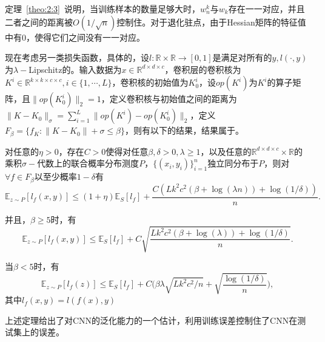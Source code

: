 \par
定理~\ref{theo:2:3}~说明，当训练样本的数量足够大时，$w_n^k$与$w_k$存在一一对应，并且二者之间的距离被$O(1/\sqrt{n})$控制住。对于退化驻点，由于Hessian矩阵的特征值中有0，使得它们之间没有一一对应。

\par
现在考虑另一类损失函数，具体的，设$l:\mathbb{R}\times \mathbb{R} \rightarrow [0,1]$是满足对所有的$y, l(\cdot,y)$为$\lambda-$Lipschitz的。输入数据为$x \in \mathbb{R}^{d\times d \times c}$，卷积层的卷积核为$K^i \in \mathbb{R}^{k\times k \times c\times c}, i\in\{1,\cdots,L\}$，卷积核的初始值为$K_0^i$，设$op(K^i)$为$K^i$的算子矩阵\cite{sedghi2018singular}，且$\|op(K^i_0)\|_2 = 1$，定义卷积核与初始值之间的距离为$\|K-K_0\|_\sigma = \sum_{i=1}^L\|op(K^i) - op(K_0^i)\|_2$，定义$F_\beta = \{f_K : \|K-K_0\|+\sigma \leq \beta\}$，则有以下的结果，结果属于\citet{long2019size}。

\begin{theorem}
对任意的$\eta > 0$，存在$C>0$使得对任意$\beta, \delta > 0, \lambda \geq 1$，以及任意的$\mathbb{R}^{d\times d \times c}\times \mathbb{R}$的乘积$\sigma-$代数上的联合概率分布测度$P$，$\{(x_i, y_i)\}_{i=1}^n$独立同分布于$P$，则对$\forall f\in F_\beta$以至少概率$1-\delta$有
\[
\mathbb{E}_{z\sim P}[l_f(x,y)] \leq (1+\eta)\mathbb{E}_S [l_f] + \frac{C(Lk^2c^2(\beta+\log(\lambda n)) + \log(1/\delta))}{n}.
\]
\par
并且，$\beta \geq 5$时，有
\[
\mathbb{E}_{z\sim P}[l_f(x,y)] \leq \mathbb{E}_S[l_f]+C\sqrt{\frac{Lk^2c^2(\beta + \log(\lambda))+\log(1/\delta)}{n}}.
\]
\par
当$\beta < 5$时，有
\[
\mathbb{E}_{z\sim P}[l_f(z)] \leq \mathbb{E}_S[l_f]+ C\big(\beta \lambda \sqrt{Lk^2c^2/n} + \sqrt{\frac{\log(1/\delta)}{n}}\big),
\]
其中$l_f(x,y) = l(f(x),y)$
\end{theorem}

\par
上述定理给出了对CNN的泛化能力的一个估计，利用训练误差控制住了CNN在测试集上的误差。
